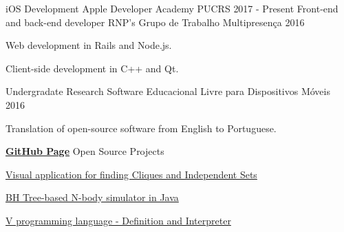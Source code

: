 \begin{cventries}
  \cventry
    {iOS Development}
    {Apple Developer Academy PUCRS}
    {}
    {2017 - Present}
    {}
  \cventry
    {Front-end and back-end developer}
    {RNP's Grupo de Trabalho Multipresença}
    {}
    {2016}
    {
      \begin{cvitems}
        \item {Web development in Rails and Node.js.}
        \item {Client-side development in C++ and Qt.}
      \end{cvitems}
    }
  \cventry
    {Undergradate Research}
    {Software Educacional Livre para Dispositivos Móveis}
    {}
    {2016}
    {
      \begin{cvitems}
        \item {Translation of open-source software from English to Portuguese.}
      \end{cvitems}
    }
  \cventry
    {\href{https://github.com/AvatarHurden/}{\textbf{GitHub Page}}}
    {Open Source Projects}
    {}
    {}
    {
      \begin{cvitems}
        \item {\href{https://github.com/AvatarHurden/Clique-and-Ind.Set-Calculator}{Visual application for finding Cliques and Independent Sets}}
        \item {\href{https://github.com/AvatarHurden/Simulador-Galaxias}{BH Tree-based N-body simulator in Java}}
        \item {\href{https://github.com/AvatarHurden/V}{V programming language - Definition and Interpreter}}
      \end{cvitems}
    }
\end{cventries}
